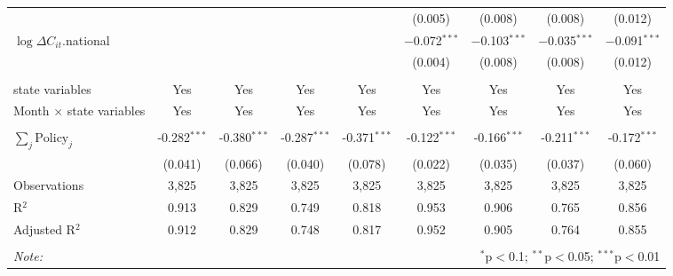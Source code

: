 \begin{tabular}{@{\extracolsep{1pt}}lcccccccc}
  &  &  &  &  & (0.005) & (0.008) & (0.008) & (0.012) \\ 
  $\log \Delta C_{it}$.national &  &  &  &  & $-$0.072$^{***}$ & $-$0.103$^{***}$ & $-$0.035$^{***}$ & $-$0.091$^{***}$ \\ 
  &  &  &  &  & (0.004) & (0.008) & (0.008) & (0.012) \\ 
 \hline \\[-1.8ex] 
state variables & Yes & Yes & Yes & Yes & Yes & Yes & Yes & Yes \\ 
Month $\times$ state variables & Yes & Yes & Yes & Yes & Yes & Yes & Yes & Yes \\ 
\hline \\[-1.8ex] 
$\sum_j \mathrm{Policy}_j$ & -0.282$^{***}$ & -0.380$^{***}$ & -0.287$^{***}$ & -0.371$^{***}$ & -0.122$^{***}$ & -0.166$^{***}$ & -0.211$^{***}$ & -0.172$^{***}$ \\ 
 & (0.041) & (0.066) & (0.040) & (0.078) & (0.022) & (0.035) & (0.037) & (0.060) \\ 
Observations & 3,825 & 3,825 & 3,825 & 3,825 & 3,825 & 3,825 & 3,825 & 3,825 \\ 
R$^{2}$ & 0.913 & 0.829 & 0.749 & 0.818 & 0.953 & 0.906 & 0.765 & 0.856 \\ 
Adjusted R$^{2}$ & 0.912 & 0.829 & 0.748 & 0.817 & 0.952 & 0.905 & 0.764 & 0.855 \\ 
\hline 
\hline \\[-1.8ex] 
\textit{Note:}  & \multicolumn{8}{r}{$^{*}$p$<$0.1; $^{**}$p$<$0.05; $^{***}$p$<$0.01} \\ 
\end{tabular} 